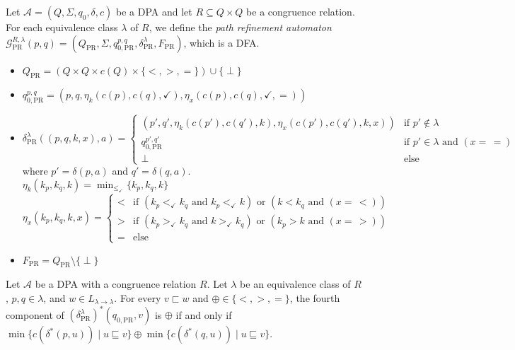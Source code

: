 \begin{defn}
	Let $\mathcal{A} = (Q, \Sigma, q_0, \delta, c)$ be a DPA and let $R \subseteq Q \times Q$ be a congruence relation. For each equivalence class $\lambda$ of $R$, we define the \emph{path refinement automaton} $\mathcal{G}_\text{PR}^{R,\lambda}(p, q) = (Q_\text{PR}, \Sigma, q_{0, \text{PR}}^{p,q}, \delta^\lambda_\text{PR}, F_\text{PR})$, which is a DFA.
	
	\begin{itemize}
		\item $Q_\text{PR} = (Q \times Q \times c(Q) \times \{<, >, =\}) \cup \{ \perp \}$
		\item $q_{0, \text{PR}}^{p,q} = (p, q, \eta_k(c(p), c(q), \checkmark), \eta_x(c(p), c(q), \checkmark, =))$
		\item $\delta^\lambda_\text{PR}((p, q, k, x), a) = \begin{cases}
			(p', q', \eta_k(c(p'), c(q'), k), \eta_x(c(p'), c(q'), k, x)) & \text{if } p' \notin \lambda \\
			q_{0,\text{PR}}^{p',q'} & \text{if } p' \in \lambda \text{ and } (x =\, =) \\
			\perp & \text{else}
		\end{cases}$ \\
			where $p' = \delta(p, a)$ and $q' = \delta(q, a)$. \\
			$\eta_k(k_p, k_q, k) = \min_{\leq_\checkmark} \{k_p, k_q, k\}$ \\
			$\eta_x(k_p, k_q, k, x) = \begin{cases}
				< & \text{if } (k_p <_\checkmark k_q \text{ and } k_p <_\checkmark k) \text{ or } (k < k_q \text{ and } (x =\, <)) \\
				> & \text{if } (k_p >_\checkmark k_q \text{ and } k >_\checkmark k_q) \text{ or } (k_p > k \text{ and } (x =\, >)) \\
				= & \text{else}
			\end{cases}$ 
		\item $F_\text{PR} = Q_\text{PR} \setminus \{\perp\}$
	\end{itemize}
\end{defn}

\begin{lem}
	Let $\mathcal{A}$ be a DPA with a congruence relation $R$. Let $\lambda$ be an equivalence class of $R$, $p, q \in \lambda$, and $w \in L_{\lambda \rightarrow \lambda}$. For every $v \sqsubset w$ and $\oplus \in \{<, >, =\}$, the fourth component of $(\delta_\text{PR}^\lambda)^*(q_{0,\text{PR}}, v)$ is $\oplus$ if and only if $\min \{ c(\delta^*(p, u)) \mid u \sqsubseteq v \} \oplus \min \{ c(\delta^*(q, u)) \mid u \sqsubseteq v \}$.
\end{lem}

